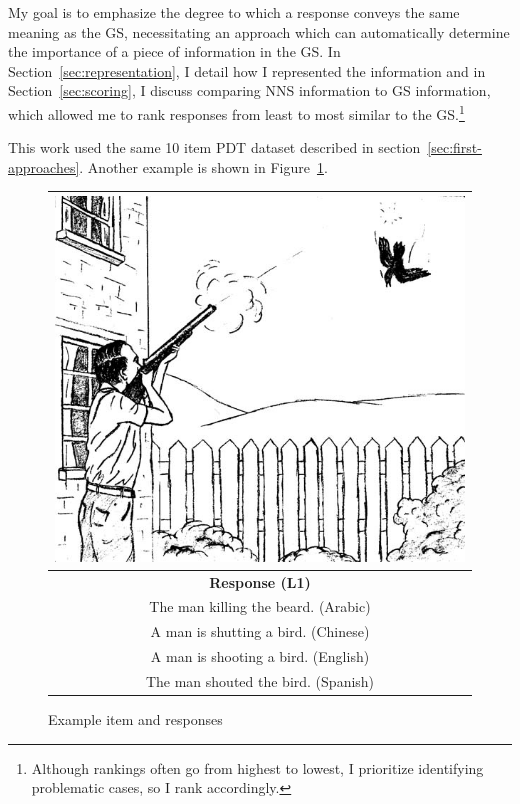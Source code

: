 My goal is to emphasize the degree to which a response conveys the same
meaning as the GS, necessitating an approach which can automatically
determine the importance of a piece of information in the GS.  In Section~\ref{sec:representation}, I detail how I represented the information
 and in Section~\ref{sec:scoring}, I discuss comparing NNS
information to GS information, which allowed me
to rank responses from least to most similar to the GS.\footnote{Although rankings often go from highest to lowest, I prioritize identifying problematic cases, so I rank accordingly.}

This work used the same 10 item PDT dataset described in section~\ref{sec:first-approaches}. Another example is shown in Figure~\ref{fig:example-picture2}.

\begin{figure}
\begin{center}
\begin{tabular}{|c|}
\hline
\includegraphics[width=0.7\columnwidth]{figures/exampleprompt2.jpg}\\
\hline
\textbf{Response (L1)} \\
\hline
The man killing the beard. (Arabic)\\
\hline
A man is shutting a bird. (Chinese) \\
\hline
A man is shooting a bird. (English) \\
\hline
The man shouted the bird. (Spanish)\\
\hline
\end{tabular}
\end{center}
\caption{Example item and responses}
\label{fig:example-picture2}
\end{figure}

